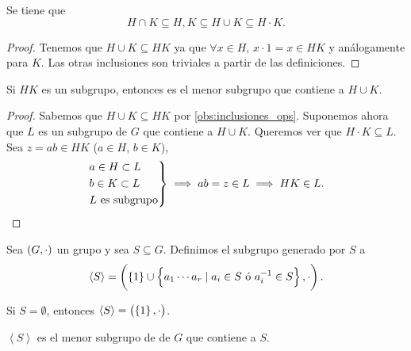 \begin{obs} \label{obs:inclusiones_ops}
    Se tiene que
    \[
        H \cap K \subseteq H, K \subseteq H \cup K \subseteq H \cdot K.
    \]
\end{obs}

\begin{proof}
    Tenemos que $H \cup K \subseteq HK$ ya que $\forall x \in H, \, x\cdot1 = x \in HK$
    y análogamente para $K$. Las otras inclusiones son triviales a partir de las definiciones.
\end{proof}

\begin{obs}
    Si $HK$ es un subgrupo, entonces es el menor subgrupo que contiene a $H \cup K$. 
\end{obs}

\begin{proof}
    Sabemos que $H \cup K \subseteq HK$ por \ref{obs:inclusiones_ops}.
    Suponemos ahora que $L$ es un subgrupo de $G$ que contiene a $H \cup K$. Queremos ver que
    $ H \cdot K \subseteq L$. Sea $z = ab \in HK$ ($a \in H$, $b \in K$),
    \[
        \begin{rcases}
            a \in H \subset L \\
            b \in K \subset L \\
            L \text{ es subgrupo}
        \end{rcases}
        \implies ab = z \in L \implies HK \in L.
    \]
\end{proof}

\begin{defi}
        Sea $\left( G, \cdot\right)$ un grupo y sea $S\subseteq G$. Definimos el subgrupo generado por $S$ a
        \[
            \left<S\right> = \left( \left\{ 1 \right\} \cup \left\{a_1 \cdots a_r \mid a_i \in S \text{ ó } a^{-1}_i \in S\right\}, \cdot \right).
        \]
\end{defi}

\begin{obs}
    Si $S = \emptyset$, entonces $\left<S\right> = \left( \left\{1\right\}, \cdot \right)$.
\end{obs}

\begin{obs}
    $\left<S\right>$ es el menor subgrupo de de $G$ que contiene a $S$.
\end{obs}

